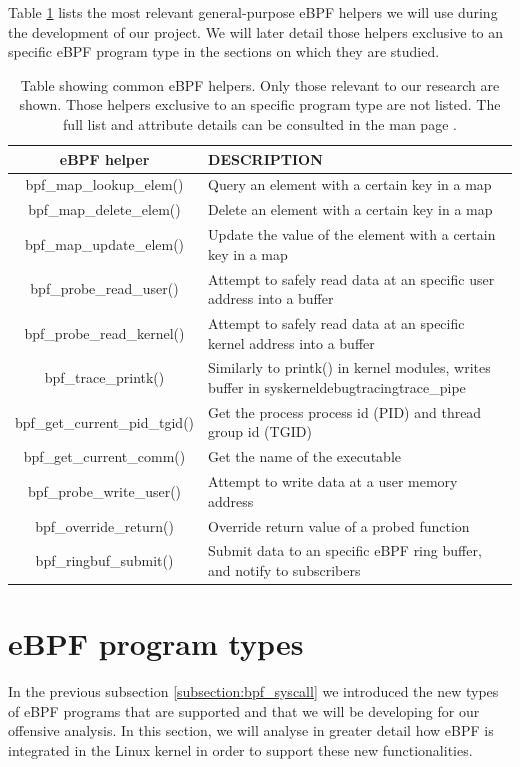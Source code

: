 \documentclass[12pt]{report} %
\begin{document}
Table \ref{table:ebpf_helpers} lists the most relevant general-purpose eBPF helpers we will use during the development of our project. We will later detail those helpers exclusive to an specific eBPF program type in the sections on which they are studied.

\begin{table}[H]
\begin{tabular}{|c|>{\centering\arraybackslash}p{10cm}|}
\hline
eBPF helper & DESCRIPTION\\
\hline
\hline
bpf\_map\_lookup\_elem() & Query an element with a certain key in a map\\
\hline
bpf\_map\_delete\_elem() & Delete an element with a certain key in a map\\
\hline
bpf\_map\_update\_elem() & Update the value of the element with a certain key in a map\\
\hline
bpf\_probe\_read\_user() & Attempt to safely read data at an specific user address into a buffer\\
\hline
bpf\_probe\_read\_kernel() & Attempt to safely read data at an specific kernel address into a buffer\\
\hline
bpf\_trace\_printk() & Similarly to printk() in kernel modules, writes buffer in \/sys\/kernel\/debug\/tracing\/trace\_pipe\\
\hline
bpf\_get\_current\_pid\_tgid() & Get the process process id (PID) and thread group id (TGID)\\
\hline
bpf\_get\_current\_comm() & Get the name of the executable\\
\hline
bpf\_probe\_write\_user() & Attempt to write data at a user memory address\\
\hline
bpf\_override\_return() & Override return value of a probed function\\
\hline
bpf\_ringbuf\_submit() & Submit data to an specific eBPF ring buffer, and notify to subscribers\\
\hline
\end{tabular}
\caption{Table showing common eBPF helpers. Only those relevant to our research are shown. Those helpers exclusive to an specific program type are not listed. The full list and attribute details can be consulted in the man page \cite{ebpf_helpers}.}
\label{table:ebpf_helpers}
\end{table}


\section{eBPF program types}
In the previous subsection \ref{subsection:bpf_syscall} we introduced the new types of eBPF programs that are supported and that we will be developing for our offensive analysis. In this section, we will analyse in greater detail how eBPF is integrated in the Linux kernel in order to support these new functionalities.
\end{document}
